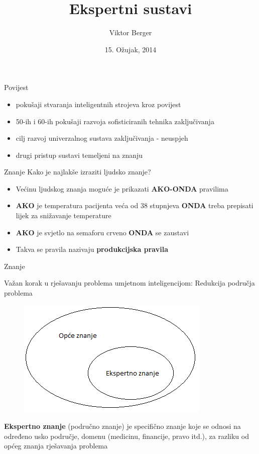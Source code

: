 \documentclass[xcolor=dvipsnames]{beamer}
\title[]{Ekspertni sustavi}
\author[V. Berger]{Viktor Berger}
\institute[UMBC]{
  Fakultet elektrotehnike i računarstva\\
}
\date[March 15]{15. Ožujak, 2014}
\begin{document}
\begin{frame}[plain]
  \titlepage
\end{frame}



\begin{frame}{Povijest}


\begin{itemize}
	\item pokušaji stvaranja inteligentnih strojeva kroz povijest
  	\item 50-ih i 60-ih pokušaji razvoja sofisticiranih tehnika zaključivanja
  	\item cilj razvoj univerzalnog sustava zaključivanja - neuspjeh
  	\item drugi pristup  sustavi temeljeni na znanju
\end{itemize}


\end{frame}






\begin{frame}{Znanje}
Kako je najlakše izraziti ljudsko znanje?
\begin{itemize}
	\item Većinu ljudskog znanja moguće je prikazati \textbf{AKO-ONDA} pravilima
  	\item \textbf{AKO} je temperatura pacijenta veća od 38 stupnjeva \textbf{ONDA} treba prepisati lijek za snižavanje temperature
  	\item \textbf{AKO} je svjetlo na semaforu crveno \textbf{ONDA} se zaustavi
  	\item Takva se pravila nazivaju \textbf{produkcijska pravila}
\end{itemize}
\end{frame}



\begin{frame}{Znanje}

Važan korak u rješavanju problema umjetnom inteligencijom: \newline
Redukcija područja problema
\begin{figure}
\center

\includegraphics[scale=0.5]{img/znanje.png}

\end{figure}

\textbf{Ekspertno znanje} (područno znanje) je specifično znanje 
koje se odnosi na određeno usko područje, domenu 
(medicinu, financije, pravo itd.), za razliku od općeg znanja 
rješavanja problema

\end{frame}
\end{document}

